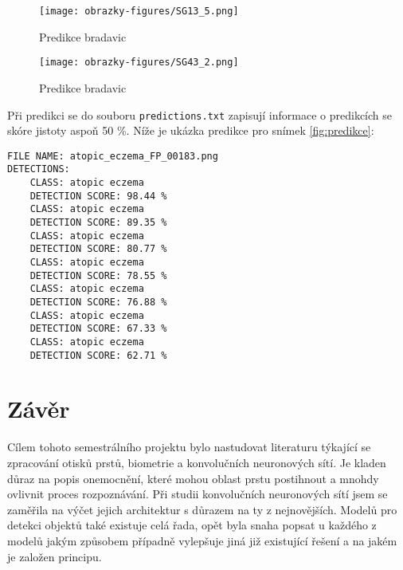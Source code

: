 \begin{figure}[!htbp]
  \begin{minipage}[b]{0.5\linewidth}
    \centering
    \texttt{[image: obrazky-figures/SG13\_5.png]}
    \caption{Predikce bradavic}
  \end{minipage}
  \hspace{0.5cm}
  \begin{minipage}[b]{0.5\linewidth}
    \centering
    \texttt{[image: obrazky-figures/SG43\_2.png]}
    \caption{Predikce bradavic}
  \end{minipage}
\end{figure}

Při predikci se do souboru \verb=predictions.txt= zapisují informace o predikcích se skóre jistoty aspoň 50 \%. Níže je ukázka predikce pro snímek \ref{fig:predikce}:
\begin{verbatim}
FILE NAME: atopic_eczema_FP_00183.png
DETECTIONS: 
	CLASS: atopic eczema
	DETECTION SCORE: 98.44 %
	CLASS: atopic eczema
	DETECTION SCORE: 89.35 %
	CLASS: atopic eczema
	DETECTION SCORE: 80.77 %
	CLASS: atopic eczema
	DETECTION SCORE: 78.55 %
	CLASS: atopic eczema
	DETECTION SCORE: 76.88 %
	CLASS: atopic eczema
	DETECTION SCORE: 67.33 %
	CLASS: atopic eczema
	DETECTION SCORE: 62.71 %
\end{verbatim}








\chapter{Závěr}
Cílem tohoto semestrálního projektu bylo nastudovat literaturu týkající se zpracování otisků prstů, biometrie a konvolučních neuronových sítí. Je kladen důraz na popis onemocnění, které mohou oblast prstu postihnout a mnohdy ovlivnit proces rozpoznávání. Při studii konvolučních neuronových sítí jsem se zaměřila na výčet jejich architektur s důrazem na ty z nejnovějších. Modelů pro detekci objektů také existuje celá řada, opět byla snaha popsat u každého z modelů jakým způsobem případně vylepšuje jiná již existující řešení a na jakém je založen principu.


